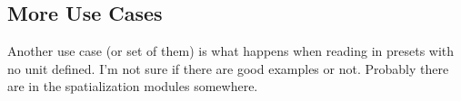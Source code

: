 \documentclass[]{article}
\begin{document}
\subsection{More Use Cases}

Another use case (or set of them) is what happens when reading in presets with no unit defined.  I'm not sure if there are good examples or not.  Probably there are in the spatialization modules somewhere.







\end{document}
